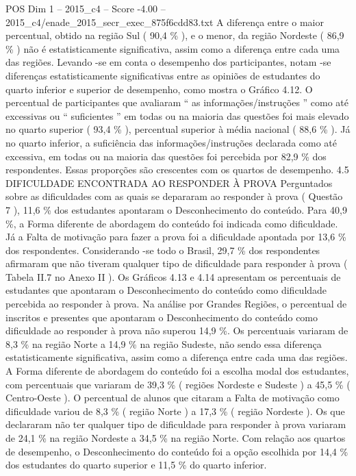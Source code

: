 \begin{textsample}{POS Dim 1 – 2015\_c4 – Score -4.00 – 2015\_c4/enade\_2015\_secr\_exec\_875f6cdd83.txt}
A diferença entre o maior percentual, obtido na região Sul ( 90,4 \% ), e o menor, da região Nordeste ( 86,9 \% ) não é estatisticamente significativa, assim como a diferença entre cada uma das regiões.
Levando -se em conta o desempenho dos participantes, notam -se diferenças estatisticamente significativas entre as opiniões de estudantes do quarto inferior e superior de desempenho, como mostra o Gráfico 4.12.
O percentual de participantes que avaliaram “ as informações/instruções ” como até excessivas ou “ suficientes ” em todas ou na maioria das questões foi mais elevado no quarto superior ( 93,4 \% ), percentual superior à média nacional ( 88,6 \% ).
Já no quarto inferior, a suficiência das informações/instruções declarada como até excessiva, em todas ou na maioria das questões foi percebida por 82,9 \% dos respondentes.
Essas proporções são crescentes com os quartos de desempenho. 4.5 DIFICULDADE ENCONTRADA AO RESPONDER À PROVA Perguntados sobre as dificuldades com as quais se depararam ao responder à prova ( Questão 7 ), 11,6 \% dos estudantes apontaram o Desconhecimento do conteúdo.
Para 40,9 \%, a Forma diferente de abordagem do conteúdo foi indicada como dificuldade.
Já a Falta de motivação para fazer a prova foi a dificuldade apontada por 13,6 \% dos respondentes.
Considerando -se todo o Brasil, 29,7 \% dos respondentes afirmaram que não tiveram qualquer tipo de dificuldade para responder à prova ( Tabela II.7 no Anexo II ).
Os Gráficos 4.13 e 4.14 apresentam os percentuais de estudantes que apontaram o Desconhecimento do conteúdo como dificuldade percebida ao responder à prova.
Na análise por Grandes Regiões, o percentual de inscritos e presentes que apontaram o Desconhecimento do conteúdo como dificuldade ao responder à prova não superou 14,9 \%.
Os percentuais variaram de 8,3 \% na região Norte a 14,9 \% na região Sudeste, não sendo essa diferença estatisticamente significativa, assim como a diferença entre cada uma das regiões.
A Forma diferente de abordagem do conteúdo foi a escolha modal dos estudantes, com percentuais que variaram de 39,3 \% ( regiões Nordeste e Sudeste ) a 45,5 \% ( Centro-Oeste ).
O percentual de alunos que citaram a Falta de motivação como dificuldade variou de 8,3 \% ( região Norte ) a 17,3 \% ( região Nordeste ).
Os que declararam não ter qualquer tipo de dificuldade para responder à prova variaram de 24,1 \% na região Nordeste a 34,5 \% na região Norte.
Com relação aos quartos de desempenho, o Desconhecimento do conteúdo foi a opção escolhida por 14,4 \% dos estudantes do quarto superior e 11,5 \% do quarto inferior.

\end{textsample}
